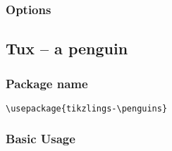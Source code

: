 \documentclass[parskip=half]{scrartcl}
\begin{document}
\begin{tcblisting}{}
\owl
\end{tcblisting}

\subsubsection{Options}

\begin{tcblisting}{}
\owl[body=SteelBlue]
\end{tcblisting}

\begin{tcblisting}{}
\owl[eye=red]
\end{tcblisting}

\begin{tcblisting}{}
\owl[pupil=red]
\end{tcblisting}

\begin{tcblisting}{}
\owl[bill=red]
\end{tcblisting}

\begin{tcblisting}{}
\owl[feet=red]
\end{tcblisting}

\begin{tcblisting}{}
\owl[3D]
\end{tcblisting}




\clearpage
\subsection{Tux -- a penguin}

\subsubsection{Package name}

\begin{tcolorbox}
\vspace*{0.5cm}
\lstinline|\usepackage{tikzlings-\penguins}|
\vspace*{0.5cm}
\end{tcolorbox}

\subsubsection{Basic Usage}
\end{document}
